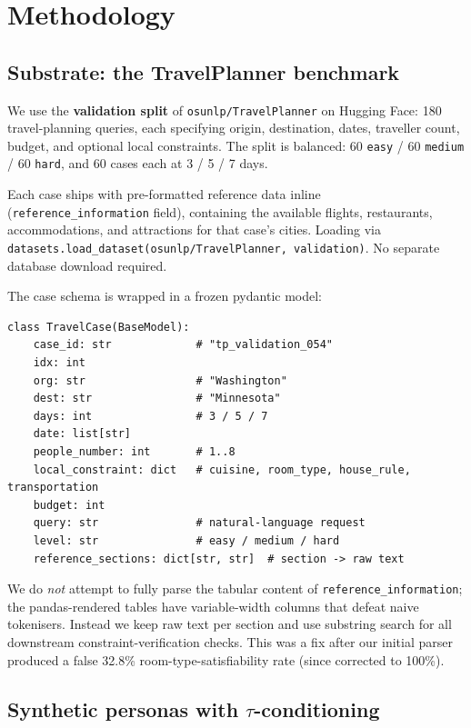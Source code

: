 \documentclass[11pt,a4paper]{article}
\begin{document}
\section{Methodology}

\subsection{Substrate: the TravelPlanner benchmark}

We use the \textbf{validation split} of \texttt{osunlp/TravelPlanner}
\cite{xie2024travelplanner} on Hugging Face: 180 travel-planning queries,
each specifying origin, destination, dates, traveller count, budget, and
optional local constraints. The split is balanced: 60 \texttt{easy} /
60 \texttt{medium} / 60 \texttt{hard}, and 60 cases each at 3 / 5 / 7 days.

Each case ships with pre-formatted reference data inline
(\texttt{reference\_information} field), containing the available flights,
restaurants, accommodations, and attractions for that case's cities.
Loading via \texttt{datasets.load\_dataset(\textquotesingle osunlp/TravelPlanner\textquotesingle, \textquotesingle validation\textquotesingle)}.
No separate database download required.

The case schema is wrapped in a frozen pydantic model:

\begin{lstlisting}
class TravelCase(BaseModel):
    case_id: str             # "tp_validation_054"
    idx: int
    org: str                 # "Washington"
    dest: str                # "Minnesota"
    days: int                # 3 / 5 / 7
    date: list[str]
    people_number: int       # 1..8
    local_constraint: dict   # cuisine, room_type, house_rule, transportation
    budget: int
    query: str               # natural-language request
    level: str               # easy / medium / hard
    reference_sections: dict[str, str]  # section -> raw text
\end{lstlisting}

We do \emph{not} attempt to fully parse the tabular content of
\texttt{reference\_information}; the pandas-rendered tables have
variable-width columns that defeat naive tokenisers. Instead we keep raw
text per section and use substring search for all downstream
constraint-verification checks. This was a fix after our initial parser
produced a false 32.8\% room-type-satisfiability rate (since corrected to
100\%).

\subsection{Synthetic personas with $\tau$-conditioning}
\end{document}
